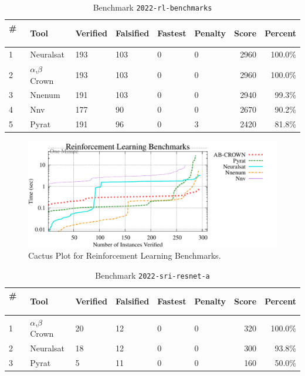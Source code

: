 
\begin{table}[h]
\begin{center}
\caption{Benchmark \texttt{2022-rl-benchmarks}} \label{tab:cat_{cat}}
{\setlength{\tabcolsep}{2pt}
\begin{tabular}[h]{@{}llllllrr@{}}
\toprule
\textbf{\# ~} & \textbf{Tool} & \textbf{Verified} & \textbf{Falsified} & \textbf{Fastest} & \textbf{Penalty} & \textbf{Score} & \textbf{Percent}\\
\midrule
1 & Neuralsat & 193 & 103 & 0 & 0 & 2960 & 100.0\% \\
2 & $\alpha$,$\beta$ Crown & 193 & 103 & 0 & 0 & 2960 & 100.0\% \\
3 & Nnenum & 191 & 103 & 0 & 0 & 2940 & 99.3\% \\
4 & Nnv & 177 & 90 & 0 & 0 & 2670 & 90.2\% \\
5 & Pyrat & 191 & 96 & 0 & 3 & 2420 & 81.8\% \\
\bottomrule
\end{tabular}
}
\end{center}
\end{table}



\begin{figure}[h]
\centerline{\includegraphics[width=\textwidth]{cactus/2022_rl_benchmarks.pdf}}
\caption{Cactus Plot for Reinforcement Learning Benchmarks.}
\label{fig:quantPic}
\end{figure}



\begin{table}[h]
\begin{center}
\caption{Benchmark \texttt{2022-sri-resnet-a}} \label{tab:cat_{cat}}
{\setlength{\tabcolsep}{2pt}
\begin{tabular}[h]{@{}llllllrr@{}}
\toprule
\textbf{\# ~} & \textbf{Tool} & \textbf{Verified} & \textbf{Falsified} & \textbf{Fastest} & \textbf{Penalty} & \textbf{Score} & \textbf{Percent}\\
\midrule
1 & $\alpha$,$\beta$ Crown & 20 & 12 & 0 & 0 & 320 & 100.0\% \\
2 & Neuralsat & 18 & 12 & 0 & 0 & 300 & 93.8\% \\
3 & Pyrat & 5 & 11 & 0 & 0 & 160 & 50.0\% \\
\bottomrule
\end{tabular}
}
\end{center}
\end{table}



